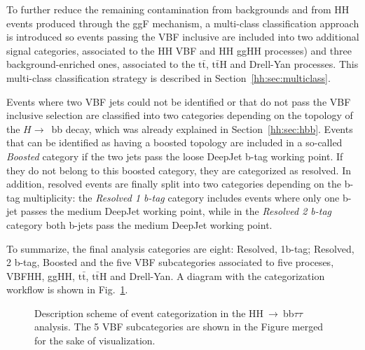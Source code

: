 \documentclass[../main.tex]{subfiles}
\begin{document}
To further reduce the remaining contamination from backgrounds and from HH events produced through the ggF mechanism, a multi-class classification approach is introduced so events passing the VBF inclusive are included into two additional signal categories, associated to the HH VBF and HH ggHH processes) and three background-enriched ones, associated to the $\text{t}\bar{\text{t}}$, $\text{t}\bar{\text{t}}$H and Drell-Yan processes. This multi-class classification strategy is described in Section~\ref{hh:sec:multiclass}.

Events where two VBF jets could not be identified or that do not pass the VBF inclusive selection are classified into two categories depending on the topology of the $H\to$~bb decay, which was already explained in Section~\ref{hh:sec:hbb}. Events that can be identified as having a boosted topology are included in a so-called \textit{Boosted} category if the two jets pass the loose DeepJet b-tag working point. If they do not belong to this boosted category, they are categorized as resolved. In addition, resolved events are finally split into two categories depending on the b-tag multiplicity: the \textit{Resolved 1 b-tag} category includes events where only one b-jet passes the medium DeepJet working point, while in the \textit{Resolved 2 b-tag} category both b-jets pass the medium DeepJet working point.

To summarize, the final analysis categories are eight: Resolved, 1b-tag; Resolved, 2 b-tag, Boosted and the five VBF subcategories associated to five proceses, VBFHH, ggHH, $\text{t}\bar{\text{t}}$, $\text{t}\bar{\text{t}}$H and Drell-Yan. A diagram with the categorization workflow is shown in Fig.~\ref{hh:fig:categorization}.

\begin{figure}[h!]
\begin{center}
\end{center}
\caption{Description scheme of event categorization in the HH$~\to~$bb$\tau\tau$ analysis. The 5 VBF subcategories are shown in the Figure merged for the sake of visualization.}
\label{hh:fig:categorization}
\end{figure}
\end{document}
